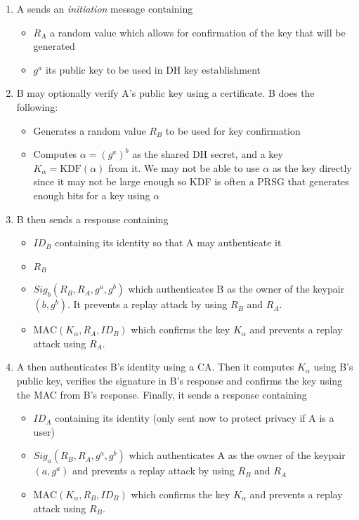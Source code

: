 \documentclass[11pt]{report}
\begin{document}
\begin{enumerate}
	\item A sends an \textit{initiation} message containing
	\begin{itemize}
		\item $R_A$ a random value which allows for confirmation of the key that will be generated
		\item $g^a$ its public key to be used in DH key establishment
	\end{itemize}
	\item B may optionally verify A's public key using a certificate. B does the following:
	\begin{itemize}
		\item Generates a random value $R_B$ to be used for key confirmation
		\item Computes $\alpha = (g^a)^b$ as the shared DH secret, and a key $K_\alpha = \text{KDF}(\alpha)$ from it. We may not be able to use $\alpha$ as the key directly since it may not be large enough so KDF is often a PRSG that generates enough bits for a key using $\alpha$
	\end{itemize}
	\item B then sends a response containing
	\begin{itemize}
		\item $ID_B$ containing its identity so that A may authenticate it
		\item $R_B$
		\item $Sig_{b}(R_B, R_A, g^a, g^b)$ which authenticates B as the owner of the keypair $(b, g^b)$. It prevents a replay attack by using $R_B$ and $R_A$.
		\item $\text{MAC}(K_\alpha, R_A, ID_B)$ which confirms the key $K_\alpha$ and prevents a replay attack using $R_A$.
	\end{itemize}
	\item A then authenticates B's identity using a CA. Then it computes $K_\alpha$ using B's public key, verifies the signature in B's response and confirms the key using the MAC from B's response. Finally, it sends a response containing
	\begin{itemize}
		\item $ID_A$ containing its identity (only sent now to protect privacy if A is a user)
		\item $Sig_{a}(R_B, R_A, g^a, g^b)$ which authenticates A as the owner of the keypair $(a, g^a)$ and prevents a replay attack by using $R_B$ and $R_A$
		\item $\text{MAC}(K_\alpha, R_B, ID_B)$ which confirms the key $K_\alpha$ and prevents a replay attack using $R_B$.
	\end{itemize}
\end{enumerate}
\end{document}
